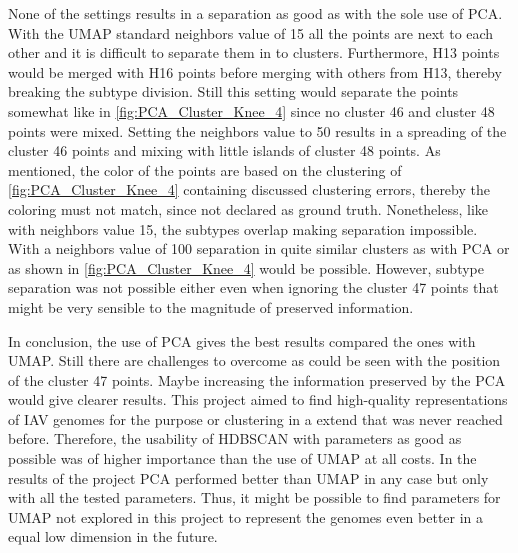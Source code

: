 None of the settings results in a separation as good as with the sole use of \gls{PCA}. With the \gls{UMAP} standard neighbors value of 15 all the points are next to each other and it is difficult to separate them in to clusters. Furthermore, H13 points would be merged with H16 points before merging with others from H13, thereby breaking the subtype division. Still this setting would separate the points somewhat like in \autoref{fig:PCA_Cluster_Knee_4} since no cluster 46 and cluster 48 points were mixed. Setting the neighbors value to 50 results in a spreading of the cluster 46 points and mixing with little islands of cluster 48 points. As mentioned, the color of the points are based on the clustering of \autoref{fig:PCA_Cluster_Knee_4} containing discussed clustering errors, thereby the coloring must not match, since not declared as ground truth. Nonetheless, like with neighbors value 15, the subtypes overlap making separation impossible. With a neighbors value of 100 separation in quite similar clusters as with \gls{PCA} or as shown in \autoref{fig:PCA_Cluster_Knee_4} would be possible. However, subtype separation was not possible either even when ignoring the cluster 47 points that might be very sensible to the magnitude of preserved information.


In conclusion, the use of PCA gives the best results compared the ones with \gls{UMAP}. Still there are challenges to overcome as could be seen with the position of the cluster 47 points. Maybe increasing the information preserved by the \gls{PCA} would give clearer results. This project aimed to find high-quality representations of \gls{IAV} genomes for the purpose or clustering in a extend that was never reached before. Therefore, the usability of \gls{HDBSCAN} with parameters as good as possible was of higher importance than the use of \gls{UMAP} at all costs. In the results of the project \gls{PCA} performed better than \gls{UMAP} in any case but only with all the tested parameters. Thus, it might be possible to find parameters for \gls{UMAP} not explored in this project to represent the genomes even better in a equal low dimension in the future.